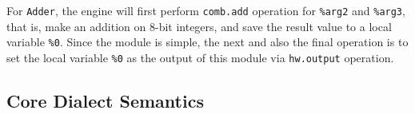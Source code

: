 For \verb|Adder|, the engine will first perform \verb|comb.add| operation for \verb|%arg2| and \verb|%arg3|, that is, make an addition on 8-bit integers, and save the result value to a local variable \verb|%0|. Since the module is simple, the next and also the final operation is to set the local variable \verb|%0| as the output of this module via \verb|hw.output| operation.


\subsection{Core Dialect Semantics}\label{sec:core-dialect-semantics}

 

